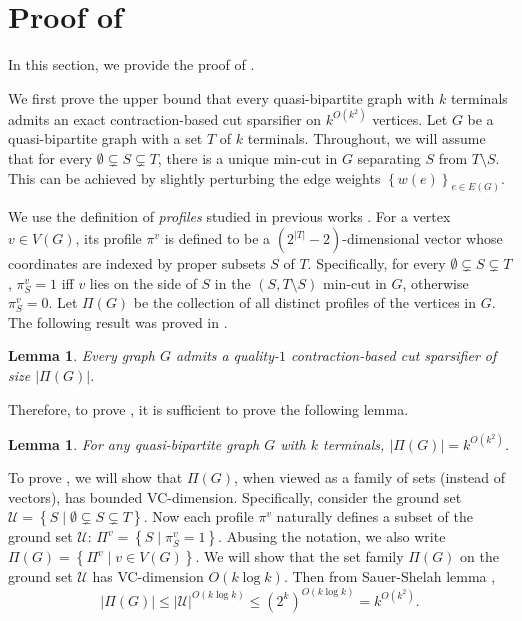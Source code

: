 \documentclass[11pt]{article}
\newtheorem{lemma}[theorem]{Lemma}
\theoremstyle{definition}
\newcommand{\set}[1]{\left\{ #1 \right\}}
\newcommand{\uset}{{\mathcal U}}
\begin{document}
 
\section{Proof of }
\label{sec: quasi_exact}

In this section, we provide the proof of . 

We first prove the upper bound that every quasi-bipartite graph with $k$ terminals admits an exact contraction-based cut sparsifier on $k^{O(k^2)}$ vertices. 
Let $G$ be a quasi-bipartite graph with a set $T$ of $k$ terminals.
Throughout, we will assume that for every $\emptyset \subsetneq S\subsetneq T$, there is a unique min-cut in $G$ separating $S$ from $T\setminus S$. This can be achieved by slightly perturbing the edge weights $\set{w(e)}_{e\in E(G)}$.

We use the definition of \emph{profiles} studied in previous works \cite{hagerup1998characterizing,khan2014mimicking}.
For a vertex $v\in V(G)$, its profile $\pi^v$ is defined to be a $(2^{|T|}-2)$-dimensional vector whose coordinates are indexed by proper subsets $S$ of $T$. Specifically, for every $\emptyset \subsetneq S\subsetneq T$, $\pi^v_S=1$ iff $v$ lies on the side of $S$ in the $(S,T \setminus S)$ min-cut in $G$, otherwise $\pi^v_S=0$. 
Let $\Pi(G)$ be the collection of all distinct profiles of the vertices in $G$.
The following result was proved in \cite{hagerup1998characterizing}.

\begin{lemma}
Every graph $G$ admits a quality-$1$ contraction-based cut sparsifier of size $|\Pi(G)|$.
\end{lemma}

Therefore, to prove , it is sufficient to prove the following lemma.

\begin{lemma} \label{quasi_profile}
For any quasi-bipartite graph $G$ with $k$ terminals, $|\Pi(G)|=k^{O(k^2)}$.
\end{lemma}

To prove , we will show that $\Pi(G)$, when viewed as a family of sets (instead of vectors), has bounded VC-dimension.
Specifically, consider the ground set $\uset=\set{S\mid \emptyset \subsetneq S\subsetneq T}$.
Now each profile $\pi^v$ naturally defines a subset of the ground set $\uset$: $\Pi^v=\set{S\mid \pi^v_S=1}$.
Abusing the notation, we also write $\Pi(G)=\set{\Pi^v\mid v\in V(G)}$.
We will show that the set family $\Pi(G)$ on the ground set $\uset$ has VC-dimension $O(k \log k)$. Then from Sauer-Shelah lemma \cite{shelah1972combinatorial,sauer1972density},  
$$|\Pi(G)|\le |\uset|^{O(k \log k)}\le (2^k)^{O(k \log k)} = k^{O(k^2)}.$$  
\end{document}
